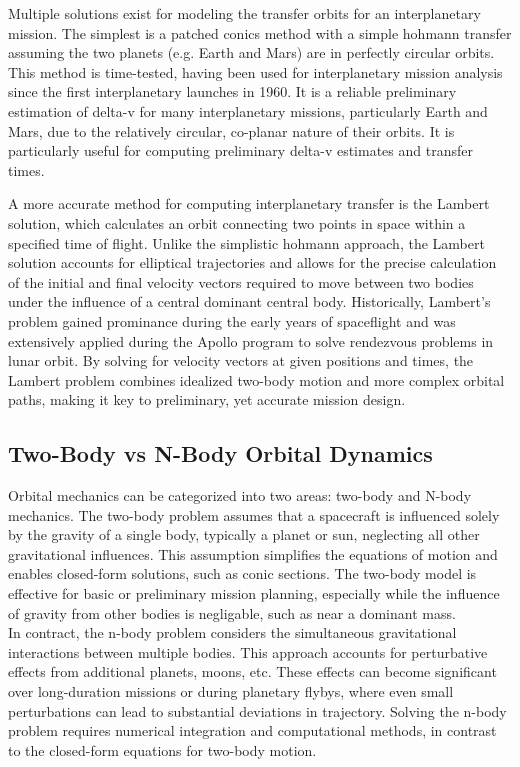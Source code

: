 \documentclass[conference]{IEEEtran}
\begin{document}
	Multiple solutions exist for modeling the transfer orbits for an interplanetary mission. The simplest is a patched conics method with a simple hohmann transfer assuming the two planets (e.g. Earth and Mars) are in perfectly circular orbits. This method is time-tested, having been used for interplanetary mission analysis since the first interplanetary launches in 1960. It is a reliable preliminary estimation of delta-v for many interplanetary missions, particularly Earth and Mars, due to the relatively circular, co-planar nature of their orbits. It is particularly useful for computing preliminary delta-v estimates and transfer times.
	
	A more accurate method for computing interplanetary transfer is the Lambert solution, which calculates an orbit connecting two points in space within a specified time of flight. Unlike the simplistic hohmann approach, the Lambert solution accounts for elliptical trajectories and allows for the precise calculation of the initial and final velocity vectors required to move between two bodies under the influence of a central dominant central body. Historically, Lambert's problem gained prominance during the early years of spaceflight and was extensively applied during the Apollo program to solve rendezvous problems in lunar orbit. By solving for velocity vectors at given positions and times, the Lambert problem combines idealized two-body motion and more complex orbital paths, making it key to preliminary, yet accurate mission design.
	
	\subsection{Two-Body vs N-Body Orbital Dynamics}
	
	Orbital mechanics can be categorized into two areas: two-body and N-body mechanics. The two-body problem assumes that a spacecraft is influenced solely by the gravity of a single body, typically a planet or sun, neglecting all other gravitational influences. This assumption simplifies the equations of motion and enables closed-form solutions, such as conic sections. The two-body model is effective for basic or preliminary mission planning, especially while the influence of gravity from other bodies is negligable, such as near a dominant mass.\\
	
	In contract, the n-body problem considers the simultaneous gravitational interactions between multiple bodies. This approach accounts for perturbative effects from additional planets, moons, etc. These effects can become significant over long-duration missions or during planetary flybys, where even small perturbations can lead to substantial deviations in trajectory. Solving the n-body problem requires numerical integration and computational methods, in contrast to the closed-form equations for two-body motion.
	
\end{document}
